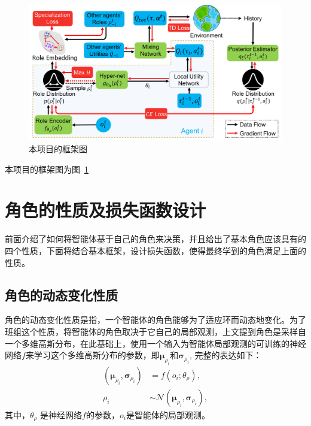 \begin{figure}
    \centering
    \includegraphics[width=0.95\linewidth]{figures/framework/framework.pdf}
    \caption{本项目的框架图}
    \label{fig:framework}
\end{figure}

本项目的框架图为图~\ref{fig:framework}

\section{角色的性质及损失函数设计}
前面介绍了如何将智能体基于自己的角色来决策，并且给出了基本角色应该具有的四个性质，下面将结合基本框架，设计损失函数，使得最终学到的角色满足上面的性质。

\subsection{角色的动态变化性质}
角色的动态变化性质是指，一个智能体的角色能够为了适应环而动态地变化。为了班组这个性质，将智能体的角色取决于它自己的局部观测，上文提到角色是采样自一个多维高斯分布，在此基础上，使用一个输入为智能体局部观测的可训练的神经网络$f$来学习这个多维高斯分布的参数，即$\bm{\mu}_{\rho_i}$和$\bm{\sigma}_{\rho_i}$, 完整的表达如下：
\begin{equation}
\begin{aligned}
(\bm{\mu}_{\rho_i}, \bm{\sigma}_{\rho_i}) &= f(o_i; \theta_\rho), \\
\rho_i &\sim \mathcal{N}(\bm{\mu}_{\rho_i}, \bm{\sigma}_{\rho_i}),
\end{aligned}
\end{equation}
其中，$\theta_\rho$ 是神经网络$f$的参数，$o_i$是智能体的局部观测。


